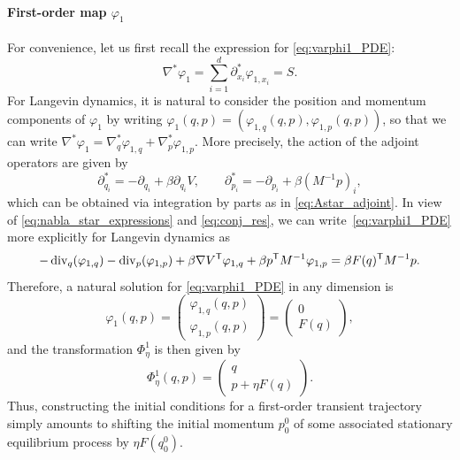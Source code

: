 \paragraph{First-order map $\varphi_1$} For convenience, let us first recall the expression for \eqref{eq:varphi1_PDE}: %
%
\begin{equation}
	\nabla^*\varphi_1 = \sum_{i=1}^d \partial_{x_i}^* \varphi_{1,x_i} = S. %
\end{equation}
%
For Langevin dynamics, it is natural to consider the position and momentum components of $\varphi_1$ by writing $\varphi_1(q,p) = (\varphi_{1,q}(q,p), \varphi_{1,p}(q,p))$, so that we can write $\nabla^*\varphi_1 = \nabla^*_q\varphi_{1,q} + \nabla^*_p\varphi_{1,p}$. More precisely, the action of the adjoint operators are given by
%
\begin{equation}
	\partial^*_{q_i} = - \partial_{q_i} + \beta\partial_{q_i} V , \qquad \partial^*_{p_i} = - \partial_{p_i} + \beta (M^{-1}p)_i,
	\label{eq:nabla_star_expressions}
\end{equation}
%
which can be obtained via integration by parts as in \eqref{eq:Astar_adjoint}. In view of \eqref{eq:nabla_star_expressions} and \eqref{eq:conj_res}, we can write~\eqref{eq:varphi1_PDE} more explicitly for Langevin dynamics as
%
\begin{equation}
	-\operatorname{div}_q(\varphi_{1,q}) - \operatorname{div}_p(\varphi_{1,p}) + \beta \nabla V^\mathsf T \varphi_{1,q} + \beta p^\mathsf T M^{-1} \varphi_{1,p} = \beta F(q)^\mathsf T M^{-1} p.
\end{equation}
%
Therefore, a natural solution for \eqref{eq:varphi1_PDE} in any dimension is
%
\begin{equation}
	\varphi_1(q,p) = \begin{pmatrix}
 	\varphi_{1,q}(q,p) \\ \varphi_{1,p}(q,p)
 	\end{pmatrix} =
	\begin{pmatrix}
 	0 \\ F(q)
 	\end{pmatrix},
 	\label{eq:varphi1_sol}
\end{equation}
%
and the transformation $\Phi^1_\eta$ is then given by
%
\begin{equation}
	\Phi_\eta^1(q,p) = 
	\begin{pmatrix}
 	  q \\ p + \eta F(q)
 	\end{pmatrix}.
\end{equation}
%
Thus, constructing the initial conditions for a first-order transient trajectory simply amounts to shifting the initial momentum $p_0^0$ of some associated stationary equilibrium process by $\eta F(q_0^0)$.

